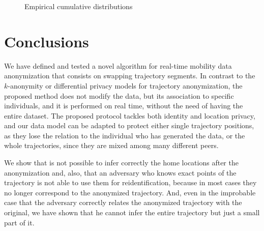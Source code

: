 \documentclass{llncs}
\begin{document}
\begin{figure}
\hfil
{}
  \caption{Empirical cumulative distributions}
  \label{fig:ECDF}
\end{figure}
\section{Conclusions}

We have defined and tested a novel algorithm for real-time mobility data \linebreak
anonymization that consists on swapping trajectory segments. In contrast to the $k$-anonymity or differential privacy models for trajectory anonymization, the proposed method does not modify the data, but its association to specific individuals, and it is performed on real time, without the need of having the entire dataset.
The proposed protocol tackles both identity and location privacy,
 and our data model can be adapted to protect either single trajectory positions, as they lose the relation to the individual who has generated the data, or the whole trajectories, since they are mixed among many different peers.

We show that is not possible to infer correctly the home locations after the anonymization and, also, that an adversary who knows exact points of the trajectory is not able to use them for reidentification, because in most cases they no longer correspond to the anonymized trajectory. And, even in the improbable case that the adversary correctly relates the anonymized trajectory with the original, we have shown that he cannot infer the entire trajectory but just a small part of it.
\end{document}
